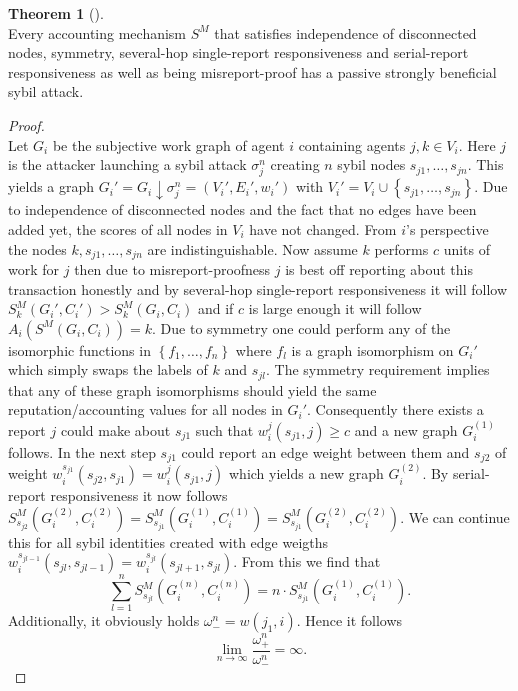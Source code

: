 \documentclass[11pt,a4paper]{report}
\theoremstyle{definition}
\theoremstyle{theorem}
\newtheorem{theorem}{Theorem}[section]
\theoremstyle{proposition}
\theoremstyle{corollary}
\theoremstyle{lemma}
\theoremstyle{example}
\theoremstyle{remark}
\begin{document}
\begin{theorem}[]\ \\
Every accounting mechanism $S^M$ that satisfies independence of disconnected nodes, symmetry, several-hop single-report responsiveness and serial-report responsiveness as well as being misreport-proof has a passive strongly beneficial sybil attack. 
\end{theorem}
\begin{proof}\ \\
Let $G_i$ be the subjective work graph of agent $i$ containing agents $j,k\in{}V_i$. Here $j$ is the attacker launching a sybil attack $\sigma_j^n$ creating $n$ sybil nodes $s_{j1},\ldots,s_{jn}$. This yields a graph $G_i'=G_i\downarrow\sigma_j^n=(V_i',E_i',w_i')$ with $V_i'=V_i\cup\left\lbrace{}s_{j1},\ldots,s_{jn}\right\rbrace$. Due to independence of disconnected nodes and the fact that no edges have been added yet, the scores of all nodes in $V_i$ have not changed. From $i$'s perspective the nodes $k,s_{j1},\ldots,s_{jn}$ are indistinguishable. Now assume $k$ performs $c$ units of work for $j$ then due to misreport-proofness $j$ is best off reporting about this transaction honestly and by several-hop single-report responsiveness it will follow $S_k^M(G_i',C_i')>S_k^M(G_i,C_i)$ and if $c$ is large enough it will follow $A_i(S^M(G_i,C_i))=k$. Due to symmetry one could perform any of the isomorphic functions in $\left\lbrace{}f_1,\ldots,f_n\right\rbrace$ where $f_l$ is a graph isomorphism on $G_i'$ which simply swaps the labels of $k$ and $s_{jl}$. The symmetry requirement implies that any of these graph isomorphisms should yield the same reputation/accounting values for all nodes in $G_i'$. Consequently there exists a report $j$ could make about $s_{j1}$ such that $w_i^j(s_{j1},j)\geq{}c$ and a new graph $G_i^{(1)}$ follows. In the next step $s_{j1}$ could report an edge weight between them and $s_{j2}$ of weight $w_i^{s_{j1}}(s_{j2},s_{j1})=w_i^j(s_{j1},j)$ which yields a new graph $G_i^{(2)}$. By serial-report responsiveness it now follows $S^M_{s_{j2}}(G_i^{(2)},C_i^{(2)}) = S^M_{s_{j1}}(G_i^{(1)},C_i^{(1)}) = S^M_{s_{j1}}(G_i^{(2)},C_i^{(2)})$. We can continue this for all sybil identities created with edge weigths $w_i^{s_{jl-1}}(s_{jl},s_{jl-1})=w_i^{s_{jl}}(s_{jl+1},s_{jl})$. From this we find that 
\[
\sum\limits_{l=1}^{n}S^M_{s_{jl}}(G_i^{(n)},C_i^{(n)}) = n\cdot{}S^M_{s_{j1}}(G_i^{(1)},C_i^{(1)}).
\]
Additionally, it obviously holds $\omega_{-}^n = w(j_1,i)$. Hence it follows
\[
\lim\limits_{n\rightarrow\infty}\frac{\omega_{+}^n}{\omega_{-}^n}=\infty.
\] 
\end{proof}
\end{document}
